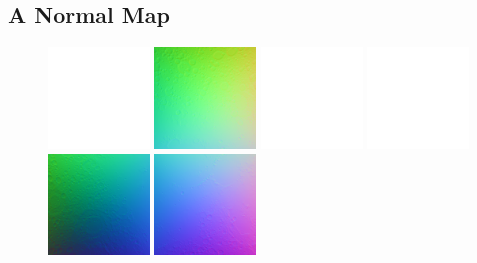 \documentclass[oneside,10pt]{memoir}
\begin{document}
\begin{Spacing}{1.1}
\subsection{A Normal Map}

\begin{figure}
  \centering
  \includegraphics[width=0.24\textwidth]{fig/blank.pdf}
  \includegraphics[width=0.24\textwidth]{fig/dtmn2.png}
  \includegraphics[width=0.24\textwidth]{fig/blank.pdf}
  \includegraphics[width=0.24\textwidth]{fig/blank.pdf}\\\vspace{1pt}
  \includegraphics[width=0.24\textwidth]{fig/dtmn1.png}
  \includegraphics[width=0.24\textwidth]{fig/dtmn4.png}

\end{figure}
\end{Spacing}
\end{document}
